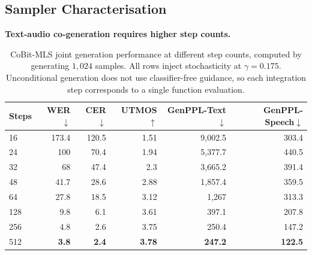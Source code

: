 \subsection{Sampler Characterisation} 

\textbf{Text-audio co-generation requires higher step counts.}

\begin{table}[t]
\centering
\small
\setlength{\tabcolsep}{4.5pt}
\begin{tabular}{lrrrrr}
\toprule
\textbf{Steps} & \textbf{WER}$\downarrow$ & \textbf{CER}$\downarrow$ & \textbf{UTMOS}$\uparrow$ & \textbf{GenPPL-Text}$\downarrow$ & \textbf{GenPPL-Speech}$\downarrow$ \\
\midrule
16 & 173.4 & 120.5 & 1.51 & 9{,}002.5 & 303.4 \\
24 & 100 & 70.4 & 1.94 & 5{,}377.7 & 440.5 \\
32 & 68 & 47.4 & 2.3 & 3{,}665.2 & 391.4\\
48 & 41.7 & 28.6 & 2.88 & 1{,}857.4 & 359.5\\
64 & 27.8 & 18.5 & 3.12 & 1{,}267 & 313.3 \\
128 & 9.8 & 6.1 & 3.61 & 397.1 & 207.8 \\
256 & 4.8 & 2.6 & 3.75 & 250.4 & 147.2 \\
512 & \textbf{3.8} & \textbf{2.4} & \textbf{3.78} & \textbf{247.2} & \textbf{122.5} \\
\bottomrule
\end{tabular}
\caption{CoBit-MLS joint generation performance at different step counts, computed by generating $1,024$ samples. All rows inject stochasticity at $\gamma=0.175$. Unconditional generation does not use classifier-free guidance, so each integration step corresponds to a single function evaluation.}
\label{tab:audio:steps:joint}
\end{table}

